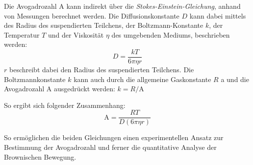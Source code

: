 Die Avogadrozahl $ \mathrm{A} $ kann indirekt über die \textit{Stokes-Einstein-Gleichung}, anhand von Messungen berechnet werden. Die Diffusionskonstante $ D $ kann dabei mittels des Radius des suspendierten Teilchens, der Boltzmann-Konstante  $ k $, der Temperatur $ T $ und der Viskosität $ \eta $ des umgebenden Mediums, beschrieben werden:
\begin{equation}
	D = \frac{kT}{6\pi\eta r}
\end{equation}
$ r $ beschreibt dabei den Radius des suspendierten Teilchens. Die Boltzmannkonstante $ k $ kann auch durch die allgemeine Gaskonstante $ R $ a und die Avogadrozahl $ \mathrm{A} $ ausgedrückt werden: $ k = R/\mathrm{A} $

So ergibt sich folgender Zusammenhang:
\begin{equation}
	\mathrm{A} = \frac{R T}{D (6 \pi \eta r)}
\end{equation}

So ermöglichen die beiden Gleichungen einen experimentellen Ansatz zur Bestimmung der Avogadrozahl und ferner die quantitative Analyse der Brownischen Bewegung.


